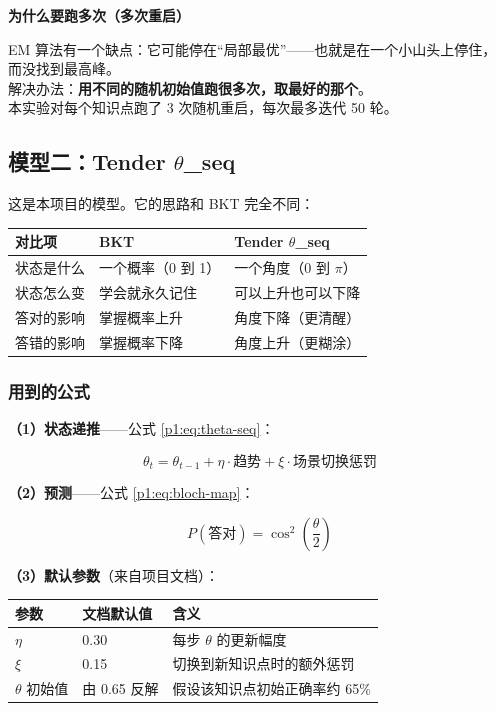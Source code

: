\documentclass[UTF8,a4paper,11pt]{ctexart}
\newenvironment{explainbox}[1]
{\begin{center}\begin{minipage}{0.94\textwidth}\colorbox{boxbg}{\parbox{0.92\textwidth}{\textbf{#1}\par\vspace{2pt}}}}
{\end{minipage}\end{center}}
\newcommand{\hl}[1]{\textcolor{blue!70!black}{\textbf{#1}}}
\begin{document}
\begin{explainbox}{为什么要跑多次（多次重启）}
EM 算法有一个缺点：它可能停在“局部最优”——也就是在一个小山头上停住，
而没找到最高峰。\\
解决办法：\textbf{用不同的随机初始值跑很多次，取最好的那个}。\\
本实验对每个知识点跑了 3 次随机重启，每次最多迭代 50 轮。
\end{explainbox}

\subsection{模型二：Tender $\theta$\_seq}

这是本项目的模型。它的思路和 BKT 完全不同：

\begin{center}
\begin{tabular}{p{3.4cm}p{5.6cm}p{4.8cm}}
\toprule
\textbf{对比项} & \textbf{BKT} & \textbf{Tender $\theta$\_seq} \\
\midrule
状态是什么 & 一个概率（0 到 1） & 一个角度（0 到 $\pi$） \\
状态怎么变 & 学会就永久记住 & 可以上升也可以下降 \\
答对的影响 & 掌握概率上升 & 角度下降（更清醒） \\
答错的影响 & 掌握概率下降 & 角度上升（更糊涂） \\
\bottomrule
\end{tabular}
\end{center}

\subsubsection{用到的公式}

\hl{（1）状态递推}——公式 \eqref{p1:eq:theta-seq}：

\begin{equation}
\theta_t = \theta_{t-1} + \eta \cdot \text{趋势} + \xi \cdot \text{场景切换惩罚}
\end{equation}

\hl{（2）预测}——公式 \eqref{p1:eq:bloch-map}：

\begin{equation}
P(\text{答对}) = \cos^2\!\left(\frac{\theta}{2}\right)
\end{equation}

\hl{（3）默认参数}（来自项目文档）：

\begin{center}
\begin{tabular}{p{2.6cm}p{2.4cm}p{9.0cm}}
\toprule
\textbf{参数} & \textbf{文档默认值} & \textbf{含义} \\
\midrule
$\eta$ & 0.30 & 每步 $\theta$ 的更新幅度 \\
$\xi$ & 0.15 & 切换到新知识点时的额外惩罚 \\
$\theta$ 初始值 & 由 0.65 反解 & 假设该知识点初始正确率约 65\% \\
\bottomrule
\end{tabular}
\end{center}
\end{document}
